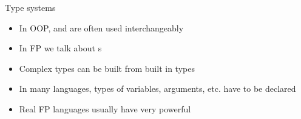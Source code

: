 \begin{frame}{Type systems}
	\begin{itemize}
		\item In OOP,  and  are often used interchangeably
		\item In FP we talk about s
		\item Complex types can be built from built in types \\
		\item In many languages, types of variables, arguments, etc. have to be declared 
		\item Real FP languages usually have very powerful %
	\end{itemize}

\end{frame}

